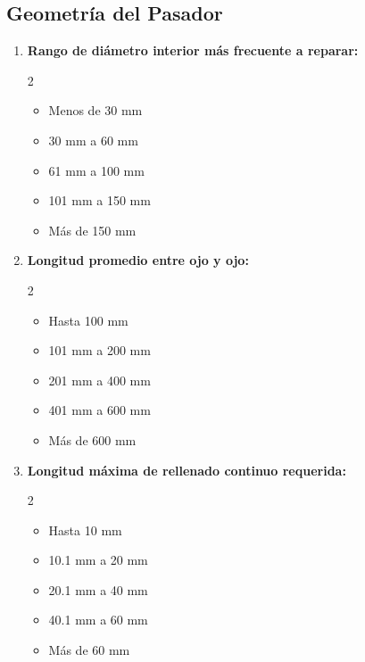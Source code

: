\documentclass[11pt,a4paper]{article}
\begin{document}
\subsection*{Geometría del Pasador}
\begin{enumerate}[resume=encuesta, leftmargin=*]
    \item \textbf{Rango de diámetro interior más frecuente a reparar:}
    \begin{multicols}{2}
    \begin{itemize}[label=$\square$, leftmargin=*]
        \item Menos de 30 mm
        \item 30 mm a 60 mm
        \item 61 mm a 100 mm
        \item 101 mm a 150 mm
        \item Más de 150 mm
    \end{itemize}
    \end{multicols}

    \item \textbf{Longitud promedio entre ojo y ojo:}
    \begin{multicols}{2}
    \begin{itemize}[label=$\square$, leftmargin=*]
        \item Hasta 100 mm
        \item 101 mm a 200 mm
        \item 201 mm a 400 mm
        \item 401 mm a 600 mm
        \item Más de 600 mm
    \end{itemize}
    \end{multicols}

    \item \textbf{Longitud máxima de rellenado continuo requerida:}
    \begin{multicols}{2}
    \begin{itemize}[label=$\square$, leftmargin=*]
        \item Hasta 10 mm
        \item 10.1 mm a 20 mm
        \item 20.1 mm a 40 mm
        \item 40.1 mm a 60 mm
        \item Más de 60 mm
    \end{itemize}
    \end{multicols}
\end{enumerate}
\end{document}
